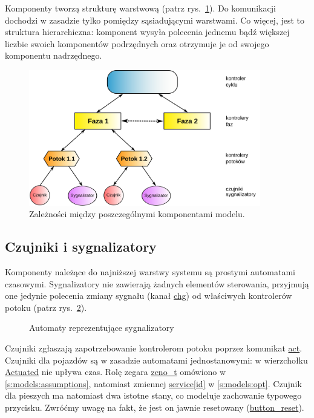 \documentclass{pracamgr}
\newcommand{\imgr}[1]{rys.~\ref{#1}}
\theoremstyle{plain}
\begin{document}
Komponenty tworzą strukturę warstwową (patrz \imgr{img:hierarchy}). Do
komunikacji dochodzi w zasadzie tylko pomiędzy sąsiadującymi
warstwami. Co więcej, jest to struktura hierarchiczna: komponent
wysyła polecenia jednemu bądź większej liczbie swoich komponentów
podrzędnych oraz otrzymuje je od swojego komponentu nadrzędnego.

\begin{figure}[h]
  \centering
  \includegraphics[width=0.9\textwidth]{img/models-hierarchy}
  \caption{Zależności między poszczególnymi komponentami modelu.}
  \label{img:hierarchy}
\end{figure}

\subsection{Czujniki i sygnalizatory}

Komponenty należące do najniższej warstwy systemu są prostymi
automatami czasowymi.
Sygnalizatory nie zawierają żadnych elementów sterowania, przyjmują
one jedynie polecenia zmiany sygnału (kanał \url{chg}) od właściwych
kontrolerów potoku (patrz \imgr{img:lights}).

\begin{figure}
  \centering
  \hspace{1cm}
  \caption{Automaty reprezentujące sygnalizatory}
  \label{img:lights}
\end{figure}

Czujniki zgłaszają zapotrzebowanie kontrolerom potoku poprzez
komunikat \url{act}. Czujniki dla pojazdów są w zasadzie automatami
jednostanowymi: w wierzchołku \url{Actuated} nie upływa czas. Rolę
zegara \url{zeno_t} omówiono w \ref{s:models:assumptions}, natomiast
zmiennej \url{service[id]} w \ref{s:models:opt}. Czujnik dla pieszych
ma natomiast dwa istotne stany, co modeluje zachowanie typowego
przycisku. Zwróćmy uwagę na fakt, że jest on jawnie resetowany
(\url{button_reset}).
\end{document}
